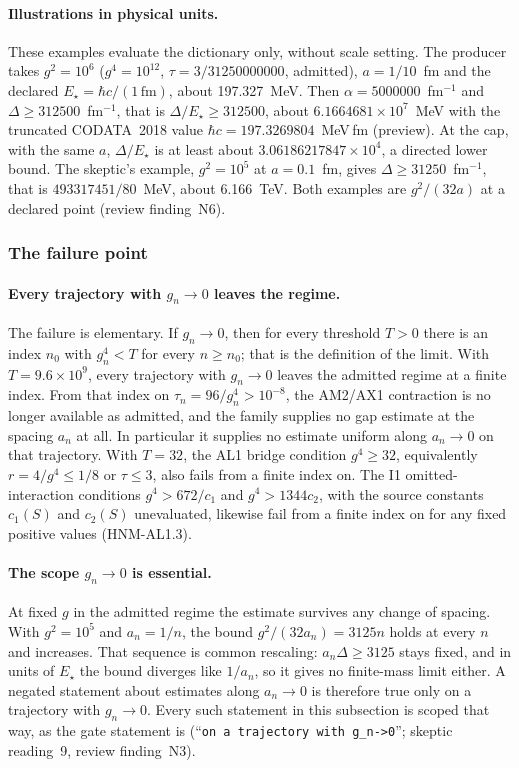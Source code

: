 \paragraph{Illustrations in physical units.}
These examples evaluate the dictionary only, without scale setting. The
producer takes $g^2=10^6$ ($g^4=10^{12}$, $\tau=3/31250000000$, admitted),
$a=1/10$~fm and the declared $E_\star=\hbar c/(1\,\mathrm{fm})$, about
197.327~MeV. Then $\alpha=5000000$~fm$^{-1}$ and
$\Delta\ge312500$~fm$^{-1}$, that is $\Delta/E_\star\ge312500$, about
$6.1664681\times10^7$~MeV with the truncated CODATA~2018 value
$\hbar c=197.3269804$~MeV\,fm (preview). At the cap, with the same $a$,
$\Delta/E_\star$ is at least about $3.06186217847\times10^4$, a directed lower
bound. The skeptic's example, $g^2=10^5$ at $a=0.1$~fm, gives
$\Delta\ge31250$~fm$^{-1}$, that is $493317451/80$~MeV, about 6.166~TeV.
Both examples are $g^2/(32a)$ at a declared point (review finding~N6).

\subsubsection{The failure point}
\label{sec:az1-failure}
\paragraph{Every trajectory with \texorpdfstring{$g_n\to0$}{g\_n -> 0} leaves the regime.}
The failure is elementary. If $g_n\to0$, then for every threshold $T>0$ there
is an index $n_0$ with $g_n^4<T$ for every $n\ge n_0$; that is the definition
of the limit. With $T=9.6\times10^9$, every trajectory with $g_n\to0$ leaves
the admitted regime at a finite index. From that index on
$\tau_n=96/g_n^4>10^{-8}$, the AM2/AX1 contraction is no longer available as
admitted, and the family supplies no gap estimate at the spacing $a_n$ at all.
In particular it supplies no estimate uniform along $a_n\to0$ on that
trajectory. With $T=32$, the AL1 bridge condition $g^4\ge32$, equivalently
$r=4/g^4\le1/8$ or $\tau\le3$, also fails from a finite index on. The I1
omitted-interaction conditions $g^4>672/c_1$ and $g^4>1344c_2$, with the
source constants $c_1(S)$ and $c_2(S)$ unevaluated, likewise fail from a
finite index on for any fixed positive values (HNM-AL1.3).

\paragraph{The scope \texorpdfstring{$g_n\to0$}{g\_n -> 0} is essential.}
At fixed $g$ in the admitted regime the estimate survives any change of
spacing. With $g^2=10^5$ and $a_n=1/n$, the bound $g^2/(32a_n)=3125n$ holds at
every $n$ and increases. That sequence is common rescaling: $a_n\Delta\ge3125$
stays fixed, and in units of $E_\star$ the bound diverges like $1/a_n$, so it
gives no finite-mass limit either. A negated statement about estimates along
$a_n\to0$ is therefore true only on a trajectory with $g_n\to0$. Every such
statement in this subsection is scoped that way, as the gate statement is
(``\texttt{on a trajectory with g\_n->0}''; skeptic reading~9, review
finding~N3).

